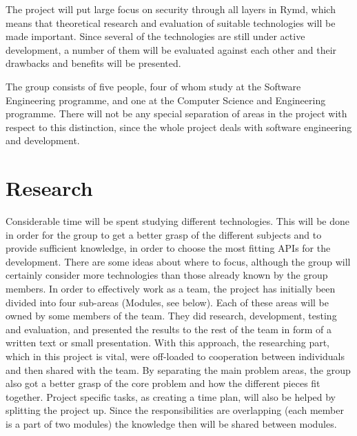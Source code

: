The project will put large focus on security through all layers in Rymd, which means that theoretical research and evaluation of suitable technologies will be made important. Since several of the technologies are still under active development, a number of them will be evaluated against each other and their drawbacks and benefits will be presented.

The group consists of five people, four of whom study at the Software Engineering programme, and one at the Computer Science and Engineering programme. There will not be any special separation of areas in the project with respect to this distinction, since the whole project deals with software engineering and development.
\section{Research}
Considerable time will be spent studying different technologies. This will be done in order for the group to get a better grasp of the different subjects and to provide sufficient knowledge, in order to choose the most fitting APIs for the development. There are some ideas about where to focus, although the group will certainly consider more technologies than those already known by the group members.
In order to effectively work as a team, the project has initially been divided into four sub-areas (Modules, see below). Each of these areas will be owned by some members of the team. They did research, development, testing and evaluation, and presented the results to the rest of the team in form of a written text or small presentation. With this approach, the researching part, which in this project is vital, were off-loaded to cooperation between individuals and then shared with the team. By separating the main problem areas, the group also got a better grasp of the core problem and how the different pieces fit together. Project specific tasks, as creating a time plan, will also be helped by splitting the project up. Since the responsibilities are overlapping (each member is a part of two modules) the knowledge then will be shared between modules.
